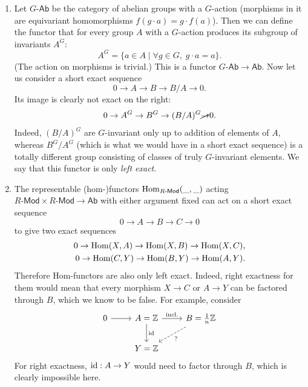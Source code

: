 \begin{example}
    \begin{enumerate}
        \item Let $G\text{-}\mathsf{Ab}$ be the category of abelian groups with a $G$-action (morphisms in it are equivariant homomorphisms $f(g\cdot a)=g\cdot f(a)$). Then we can define the functor that for every group $A$ with a $G$-action produces its subgroup of invariants $A^G$:
        \[A^G=\{a\in A\mid \forall g\in G,\; g\cdot a=a\}.\]
        (The action on morphisms is trivial.) This is a functor $G\text{-}\mathsf{Ab}\to\mathsf{Ab}$. Now let us consider a short exact sequence
        \[0\to A\to B\to B/A\to 0.\]
        Its image is clearly not exact on the right:
        \[0\to A^G\to B^G\to (B/A)^G \cancel{\to} 0.\]
        Indeed, $(B/A)^G$ are $G$-invariant only up to addition of elements of $A$, whereas $B^G/A^G$ (which is what we would have in a short exact sequence) is a totally different group consisting of classes of truly $G$-invariant elements. We say that this functor is only \emph{left exact}.
        \item The representable (hom-)functors $\operatorname{Hom}_{R\text{-}\mathsf{Mod}}(\_,\_)$ acting $R\text{-}\mathsf{Mod}\times R\text{-}\mathsf{Mod}\to \mathsf{Ab}$ with either argument fixed can act on a short exact sequence 
        \[0\to A\to B\to C\to 0\]
        to give two exact sequences
        \begin{eqnarray}
            0\to \operatorname{Hom}(X,A)\to \operatorname{Hom}(X,B)\to \operatorname{Hom}(X,C),\\
            0\to \operatorname{Hom}(C,Y)\to \operatorname{Hom}(B,Y)\to \operatorname{Hom}(A,Y).
        \end{eqnarray}
        Therefore Hom-functors are also only left exact. Indeed, right exactness for them would mean that every morphism $X\to C$ or $A\to Y$ can be factored through $B$, which we know to be false. For example, consider
        \[\begin{tikzcd}
        0\arrow[r]& A=\bbZ\arrow[r,"\text{incl.}"]\arrow[d,
        "\id"]& B=\frac{1}{n}\bbZ\arrow[dl,dashed,"?"] \\
         &Y=\bbZ &
        \end{tikzcd}\]
        For right exactness, $\operatorname{id}:A\to Y$ would need to factor through $B$, which is clearly impossible here.
        

\end{enumerate}
\end{example}
